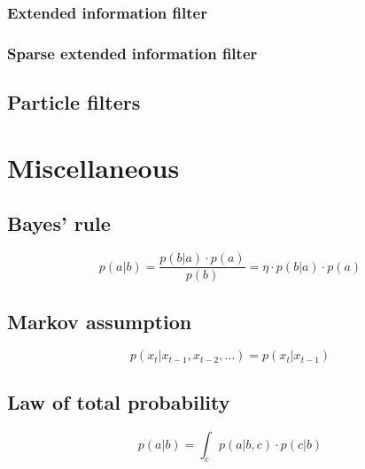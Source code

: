 \documentclass{article}
\begin{document}
\subsubsection{Extended information filter}

\subsubsection{Sparse extended information filter}

\subsection{Particle filters}

\printbibliography{}

\section{Miscellaneous}

\subsection{Bayes' rule}
\begin{equation}\label{bayes}
  p(a \vert b) = \frac{p(b \vert a) \cdot p(a)}{p(b)}
    = \eta \cdot p(b \vert a) \cdot p(a)
\end{equation}

\subsection{Markov assumption}
\begin{equation}\label{markov}
  p(x_t \vert x_{t-1}, x_{t-2}, \dots) = p(x_t \vert x_{t-1})
\end{equation}

\subsection{Law of total probability}
\begin{equation}\label{totalprobability}
  p(a \vert b) = \int_{c} p(a \vert b, c) \cdot p(c \vert b)
\end{equation}
\end{document}
